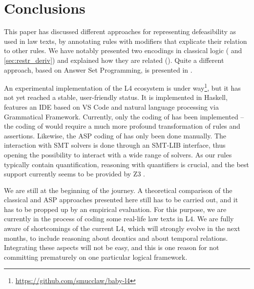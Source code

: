 \section{Conclusions}\label{sec:conclusions}

This paper has discussed different approaches for representing defeasibility
as used in law texts, by annotating rules with modifiers that explicate their
relation to other rules. We have notably presented two encodings in classical
logic ( and \ref{sec:restr_deriv}) and explained
how they are related (). Quite a different approach,
based on Answer Set Programming, is presented in
.

An experimental implementation of the L4 ecosystem is under
way\footnote{\url{https://github.com/smucclaw/baby-l4}}, but it has not yet
reached a stable, user-friendly status. It is implemented in Haskell, features
an IDE based on VS Code and natural language processing via Grammatical
Framework\cite{ranta_grammatical_2004}. Currently, only the coding of
 has been implemented -- the coding of
 would require a much more profound transformation of
rules and assertions. Likewise, the ASP coding of 
has only been done manually. The interaction with SMT solvers is done through
an SMT-LIB \cite{BarFT_SMTLIB} interface, thus opening the possibility to
interact with a wide range of solvers. As our rules typically contain
quantification, reasoning with quantifiers is crucial, and the best support
currently seems to be provided by Z3 \cite{demoura_bjorner_z3_2008}.

We are still at the beginning of the journey. A theoretical comparison of the
classical and ASP approaches presented here still has to be carried out, and
it has to be propped up by an empirical evaluation. For this purpose, we are
currently in the process of coding some real-life law texts in L4. We are
fully aware of shortcomings of the current L4, which will strongly evolve in
the next months, to include reasoning about deontics and about temporal
relations. Integrating these aspects will not be easy, and this is one reason
for not committing prematurely on one particular logical framework.


